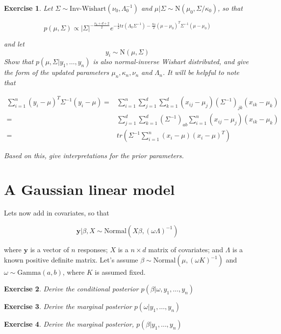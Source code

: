 \documentclass[twoside]{article}
\newcounter{lecnum}
\newtheorem{exercise}{Exercise}[lecnum]
\begin{document}
\begin{exercise}
  Let $\Sigma \sim \mbox{Inv-Wishart}(\nu_0, \Lambda_0^{-1})$ and $\mu|\Sigma \sim \mbox{N}(\mu_0, \Sigma/\kappa_0)$, so that

  $$p(\mu,\Sigma) \propto |\Sigma|^{-\frac{\nu_0+d+2}{2}}e^{-\frac{1}{2}\mbox{tr}(\Lambda_0\Sigma^{-1}) - \frac{\kappa_0}{2}(\mu-\mu_0)^T\Sigma^{-1}(\mu-\mu_0)}$$

  and let
  $$y_i \sim \mbox{N}(\mu, \Sigma)$$
  Show that $p(\mu, \Sigma|y_1,\dots,y_n)$ is also normal-inverse Wishart distributed, and give the form of the updated parameters $\mu_n, \kappa_n, \nu_n$ and $\Lambda_n$. It will be helpful to note that

  $$\begin{aligned}\sum_{i=1}^n(y_i-\mu)^T\Sigma^{-1}(y_i-\mu) =& \sum_{i=1}^n\sum_{j=1}^d\sum_{k=1}^d(x_{ij}-\mu_j)(\Sigma^{-1})_{jk}(x_{ik}-\mu_k)\\
    =& \sum_{j=1}^d\sum_{k=1}^d (\Sigma^{-1})_{ab}\sum_{i=1}^n(x_{ij}-\mu_j)(x_{ik}-\mu_k)\\
    =& tr\left(\Sigma^{-1}\sum_{i=1}^n(x_i-\mu)(x_i-\mu)^T\right)\end{aligned}$$
  
  Based on this, give interpretations for the prior parameters.
\end{exercise}
\newpage
\section{A Gaussian linear model}
Lets now add in covariates, so that

$$\mathbf{y}|\beta, X \sim \mbox{Normal}(X\beta, (\omega \Lambda)^{-1})$$

where $\mathbf{y}$ is a vector of $n$ responses; $X$ is a $n\times d$ matrix of covariates; and $\Lambda$ is a known positive definite matrix.
Let's assume $\beta\sim \mbox{Normal}(\mu, (\omega K)^{-1})$ and $\omega \sim \mbox{Gamma}(a,b)$, where $K$ is assumed fixed.


\begin{exercise}
  Derive the conditional posterior $p(\beta|\omega, y_1,\dots, y_n)$
\end{exercise}

\begin{exercise}
  Derive the marginal posterior $p(\omega|y_1,\dots, y_n)$
\end{exercise}

\begin{exercise}
  Derive the marginal posterior, $p(\beta|y_1,\dots, y_n)$
\end{exercise}
\end{document}
